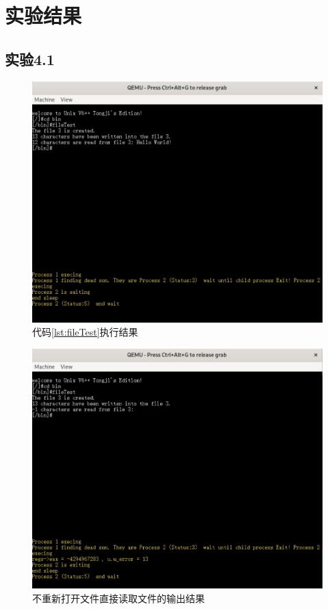 \section{实验结果}
\subsection{实验4.1}
\begin{figure}[!htbp]
    \centering
    \includegraphics[width=\textwidth]{images/p1true.png}
    \caption{代码\ref{lst:fileTest}执行结果}\label{p1true}
\end{figure}

\begin{figure}[!htbp]
    \centering
    \includegraphics[width=\textwidth]{images/p1false.png}
    \caption{不重新打开文件直接读取文件的输出结果}\label{p1false}
\end{figure}


